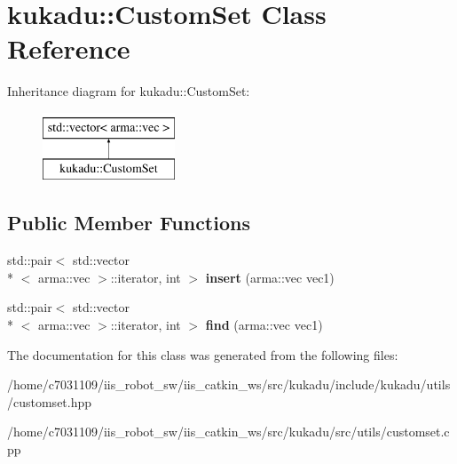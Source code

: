 \hypertarget{classkukadu_1_1CustomSet}{\section{kukadu\-:\-:Custom\-Set Class Reference}
\label{classkukadu_1_1CustomSet}
}
Inheritance diagram for kukadu\-:\-:Custom\-Set\-:\begin{figure}[H]
\begin{center}
\leavevmode
\includegraphics[height=2.000000cm]{classkukadu_1_1CustomSet}
\end{center}
\end{figure}
\subsection*{Public Member Functions}
\begin{DoxyCompactItemize}
\item 
\hypertarget{classkukadu_1_1CustomSet_aba3114ce0bb11303b44a9781650e24e2}{std\-::pair$<$ std\-::vector\\*
$<$ arma\-::vec $>$\-::iterator, int $>$ {\bfseries insert} (arma\-::vec vec1)}\label{classkukadu_1_1CustomSet_aba3114ce0bb11303b44a9781650e24e2}

\item 
\hypertarget{classkukadu_1_1CustomSet_a5339205bb45abd8c4a3ea927c000aa2e}{std\-::pair$<$ std\-::vector\\*
$<$ arma\-::vec $>$\-::iterator, int $>$ {\bfseries find} (arma\-::vec vec1)}\label{classkukadu_1_1CustomSet_a5339205bb45abd8c4a3ea927c000aa2e}

\end{DoxyCompactItemize}


The documentation for this class was generated from the following files\-:\begin{DoxyCompactItemize}
\item 
/home/c7031109/iis\-\_\-robot\-\_\-sw/iis\-\_\-catkin\-\_\-ws/src/kukadu/include/kukadu/utils/customset.\-hpp\item 
/home/c7031109/iis\-\_\-robot\-\_\-sw/iis\-\_\-catkin\-\_\-ws/src/kukadu/src/utils/customset.\-cpp\end{DoxyCompactItemize}
